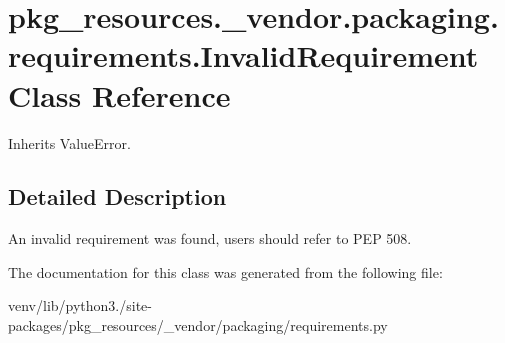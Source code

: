 \hypertarget{classpkg__resources_1_1__vendor_1_1packaging_1_1requirements_1_1_invalid_requirement}{}\section{pkg\+\_\+resources.\+\_\+vendor.\+packaging.\+requirements.\+Invalid\+Requirement Class Reference}
\label{classpkg__resources_1_1__vendor_1_1packaging_1_1requirements_1_1_invalid_requirement}


Inherits Value\+Error.



\subsection{Detailed Description}
\begin{DoxyVerb}An invalid requirement was found, users should refer to PEP 508.
\end{DoxyVerb}
 

The documentation for this class was generated from the following file\+:\begin{DoxyCompactItemize}
\item 
venv/lib/python3./site-\/packages/pkg\+\_\+resources/\+\_\+vendor/packaging/requirements.\+py\end{DoxyCompactItemize}

